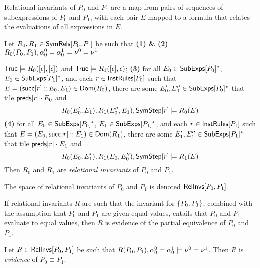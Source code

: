 Relational invariants of $P_0$ and $P_1$ are a map from pairs of
sequences of subexpressions of $P_0$ and $P_1$, with each pair $E$
mapped to a formula that relates the evaluations of all expressions in
$E$.
%
\begin{defn}
  \label{defn:rel-invs}
  Let $R_0, R_1 \in \mathsf{SymRels}[ P_0, P_1 ]$ be such that %
  \textbf{(1) \& (2)} 
$R_0(P_0, P_1), \alpha^0_0
  = \alpha^1_0 \models \nu^0 = \nu^1$

$\mathsf{True} \models R_0([ \epsilon ], [ \epsilon ])$
  and $\mathsf{True} \models R_1( [ \epsilon ], \epsilon)$;
  \textbf{(3)} for all $E_0 \in \mathsf{SubExps}[ P_0 ]^{*}$, %
  $E_1 \in \mathsf{SubExps}[ P_1 ]^{*}$, and %
  each $r \in \mathsf{InstRules}[ P_0 ]$ such that $E = (\mathsf{succ}[ r ] \mathbin{::} E_0,
  E_1) \in \mathsf{Dom}(R_0)$, %
  there are some $E_0', E_0'' \in \mathsf{SubExps}[ P_0 ]^{*}$ that tile
  $\mathsf{preds}[  r  ] \cdot E_0$ and
  \[ R_0(E_0', E_1), R_1(E_0'', E_1), \symstep{ r } \entails %
  R_0(E) \]
  \textbf{(4)} for all $E_0 \in \mathsf{SubExps}[ P_0 ]^{*}$, %
  $E_1 \in \mathsf{SubExps}[ P_1 ]^{*}$, and %
  each $r \in \mathsf{InstRules}[ P_1 ]$ such that $E = (E_0, \mathsf{succ}[ r ] \mathbin{::}
  E_1) \in \mathsf{Dom}(R_1)$, %
  there are some $E_1', E_1'' \in \mathsf{SubExps}[ P_1 ]^{*}$ that tile
  $\mathsf{preds}[  r  ] \cdot E_1$ and
  \[ R_0(E_0, E_1'), R_1(E_0, E_0''), \symstep{ r } \entails %
  R_1(E) \]
  Then $R_0$ and $R_1$ are \emph{relational invariants} of $P_0$ and
  $P_1$.
\end{defn}
%
%
The space of relational invariants of $P_0$ and $P_1$ is denoted
$\mathsf{RelInvs}[ P_0, P_1 ]$.

If relational invariants $R$ are such that the invariant for $\{ 
  P_0, P_1  \}$, combined with the assumption that $P_0$ and $P_1$ are
given equal values, entails that $P_0$ and $P_1$ evaluate to equal
values, then $R$ is evidence of the partial equivalence of $P_0$ and
$P_1$.
%
\begin{defn}
  \label{defn:eq-pf}
  Let $R \in \mathsf{RelInvs}[ P_0, P_1 ]$ be such that $R(P_0, P_1), \alpha^0_0
  = \alpha^1_0 \models \nu^0 = \nu^1$.
  Then $R$ is \emph{evidence} of $P_0 \equiv P_1$.
\end{defn}

\begin{ex}
  \label{ex:rel-invs}
\end{ex}

